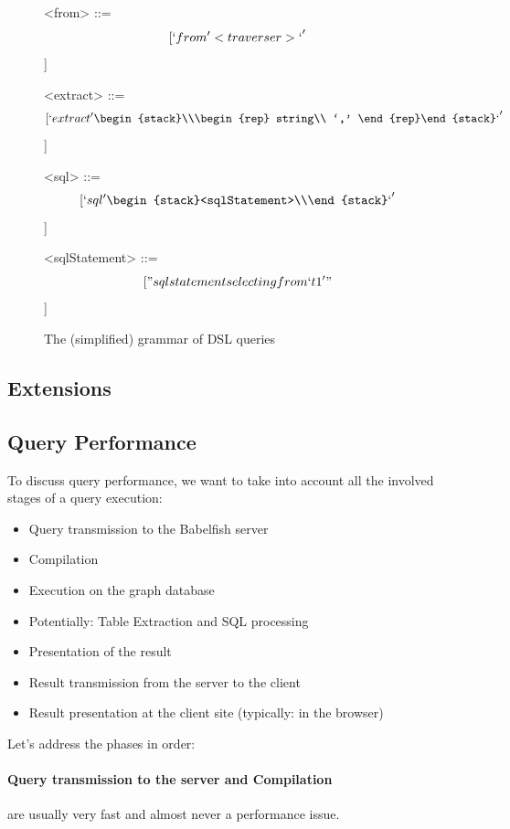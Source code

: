 \begin{figure}[hp]
\ContinuedFloat
\begin{grammar}
<from> ::= \[[`from {' <traverser> `}'\]]

<extract> ::= \[[`extract {' \begin{stack}\\\begin{rep} string\\ `,' \end{rep}\end{stack}`}'\]]

<sql> ::= \[[`sql {' \begin{stack}<sqlStatement>\\\end{stack}`}'\]]

<sqlStatement> ::= \[[ "sql statement selecting from `t1'" \]]
\end{grammar}
\caption[]{The (simplified) grammar of DSL queries}
\end{figure}

\subsection{Extensions} \todo

\subsection{Query Performance}
To discuss query performance, we want to take into account all the involved stages of a query execution:
\begin{itemize}
\item Query transmission to the Babelfish server
\item Compilation
\item Execution on the graph database
\item Potentially: Table Extraction and SQL processing
\item Presentation of the result
\item Result transmission from the server to the client
\item Result presentation at the client site (typically: in the browser)
\end{itemize}

Let's address the phases in order:
\paragraph{Query transmission to the server and Compilation} are usually very fast and almost never a performance issue.

